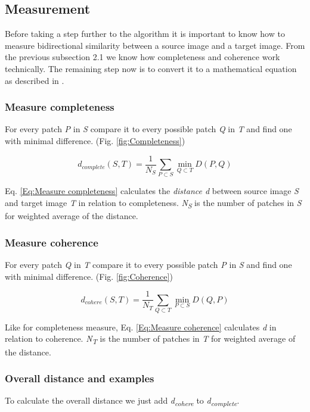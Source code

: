 \subsection{Measurement}
Before taking a step further to the algorithm it is important to know how to measure bidirectional similarity between a source image and a target image. From the previous subsection 2.1 we know how completeness and coherence work technically. The remaining step now is to convert it to a mathematical equation as described in \cite{bisi}.

\subsubsection*{Measure completeness}
For every patch \textit{P} in \textit{S} compare it to every possible patch \textit{Q} in \textit{T} and find one with minimal difference. (Fig. \ref{fig:Completeness})

\large
\begin{equation}
\label{Eq:Measure completeness}
d_{complete}(S,T)=\frac{1}{N_{S}}\sum_{P \subset S} \min\limits_{Q \subset T} D(P,Q)
\end{equation}
\normalsize

Eq. \ref{Eq:Measure completeness} calculates the \textit{distance d} between source image \textit{S} and target image \textit{T} in relation to completeness. \textit{N\textsubscript{S}} is the number of patches in \textit{S} for weighted average of the distance.

\subsubsection*{Measure coherence}
For every patch \textit{Q} in \textit{T} compare it to every possible patch \textit{P} in \textit{S} and find one with minimal difference. (Fig. \ref{fig:Coherence})

\large
\begin{equation}
\label{Eq:Measure coherence}
d_{cohere}(S,T)=\frac{1}{N_{T}}\sum_{Q \subset T} \min\limits_{P \subset S} D(Q,P)
\end{equation}
\normalsize

Like for completeness measure, Eq. \ref{Eq:Measure coherence} calculates \textit{d} in relation to coherence. \textit{N\textsubscript{T}} is the number of patches in \textit{T} for weighted average of the distance.

\subsubsection*{Overall distance and examples}
To calculate the overall distance we just add \textit{d\textsubscript{cohere}} to \textit{d\textsubscript{complete}}.

